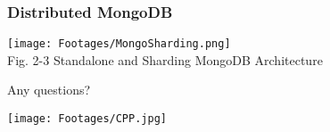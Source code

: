 \documentclass{beamer}
\begin{document}
\begin{frame} \small
\frametitle{Distributed MongoDB}
\begin{center}
\texttt{[image: Footages/MongoSharding.png]}\\
\scriptsize Fig. 2-3 Standalone and Sharding MongoDB Architecture
\end{center}
\end{frame}
\begin{frame}
\begin{center}
\LARGE Any questions?
\end{center}
\end{frame}

\begin{frame}
\begin{center}
  \texttt{[image: Footages/CPP.jpg]}
\end{center}
\end{frame}
\end{document}
